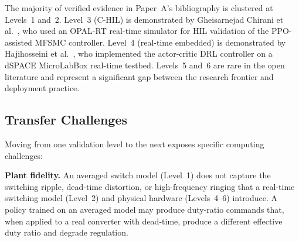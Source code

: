 \documentclass[manuscript,screen,review]{acmart}
\begin{document}
The majority of verified evidence in Paper~A's bibliography is clustered at Levels~1 and~2.
Level~3 (C-HIL) is demonstrated by Gheisarnejad Chirani et al.~\cite{gheisarnejad2022reducing}, who used an OPAL-RT real-time simulator for HIL validation of the PPO-assisted MFSMC controller.
Level~4 (real-time embedded) is demonstrated by Hajihosseini et al.~\cite{hajihosseini2020dc}, who implemented the actor-critic DRL controller on a dSPACE MicroLabBox real-time testbed.
Levels~5 and~6 are rare in the open literature and represent a significant gap between the research frontier and deployment practice.

\subsection{Transfer Challenges}

Moving from one validation level to the next exposes specific computing challenges:

\textbf{Plant fidelity.}
An averaged switch model (Level~1) does not capture the switching ripple, dead-time distortion, or high-frequency ringing that a real-time switching model (Level~2) and physical hardware (Levels~4--6) introduce.
A policy trained on an averaged model may produce duty-ratio commands that, when applied to a real converter with dead-time, produce a different effective duty ratio and degrade regulation.
\end{document}
